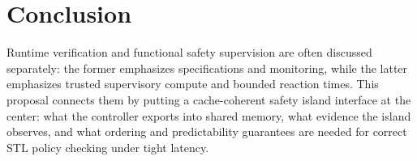 \documentclass[letterpaper,twocolumn,10pt]{article}
\newcommand{\SafetyIsland}{safety island\xspace}
\newcommand{\STL}{STL\xspace}
\begin{document}
\section{Conclusion}
Runtime verification and functional safety supervision are often discussed separately: the former emphasizes specifications and monitoring, while the latter emphasizes trusted supervisory compute and bounded reaction times. This proposal connects them by putting a cache-coherent \SafetyIsland interface at the center: what the controller exports into shared memory, what evidence the island observes, and what ordering and predictability guarantees are needed for correct \STL policy checking under tight latency.

{\footnotesize


}
\end{document}
